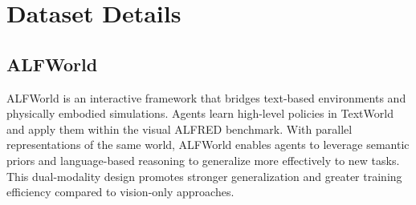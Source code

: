 \documentclass[11pt]{article}
\begin{document}
\appendix
\section{Dataset Details}
\label{appx:a} 

\subsection{ALFWorld}
ALFWorld is an interactive framework that bridges text-based environments and physically embodied simulations. Agents learn high-level policies in TextWorld and apply them within the visual ALFRED benchmark. With parallel representations of the same world, ALFWorld enables agents to leverage semantic priors and language-based reasoning to generalize more effectively to new tasks. This dual-modality design promotes stronger generalization and greater training efficiency compared to vision-only approaches.
 

\begin{table}[t]
\begin{center} 
\renewcommand{\arraystretch}{1}   
\setlength\tabcolsep{16pt} 
\end{center}
\vspace{-0.3cm}
\caption{Hyper-parameters for RL training.}\label{tab:hyp} 
\vspace{-0.3cm}
\end{table}
\end{document}
